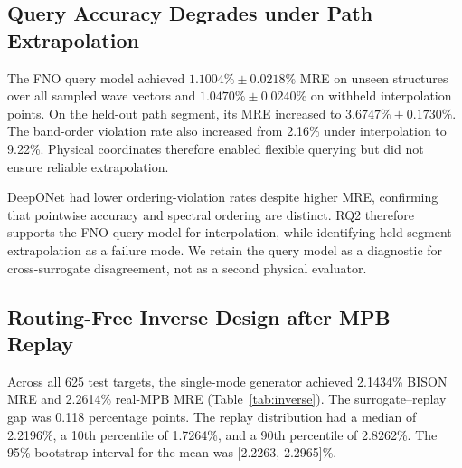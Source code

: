 \subsection{Query Accuracy Degrades under Path Extrapolation}

The FNO query model achieved \(1.1004\%\pm0.0218\%\) MRE on unseen structures
over all sampled wave vectors and \(1.0470\%\pm0.0240\%\) on withheld
interpolation points. On the held-out path segment, its MRE increased to
\(3.6747\%\pm0.1730\%\). The band-order violation rate also increased from
2.16\% under interpolation to 9.22\%. Physical coordinates therefore enabled
flexible querying but did not ensure reliable extrapolation.

\begin{table}[t]
  \caption{Query evaluation over seeds 0, 1, and 2. Entries are mean MRE (\%)
  and band-order violation rate (\%) on unseen structures.}
  \label{tab:query}
  \centering
  \small
\end{table}

DeepONet had lower ordering-violation rates despite higher MRE, confirming that
pointwise accuracy and spectral ordering are distinct. RQ2 therefore supports
the FNO query model for interpolation, while identifying held-segment
extrapolation as a failure mode. We retain the query model as a diagnostic for
cross-surrogate disagreement, not as a second physical evaluator.

\subsection{Routing-Free Inverse Design after MPB Replay}

Across all 625 test targets, the single-mode generator achieved 2.1434\%
BISON MRE and 2.2614\% real-MPB MRE (Table~\ref{tab:inverse}). The
surrogate--replay gap was 0.118 percentage points. The replay distribution had
a median of 2.2196\%, a 10th percentile of 1.7264\%, and a 90th percentile of
2.8262\%. The 95\% bootstrap interval for the mean was [2.2263, 2.2965]\%.

